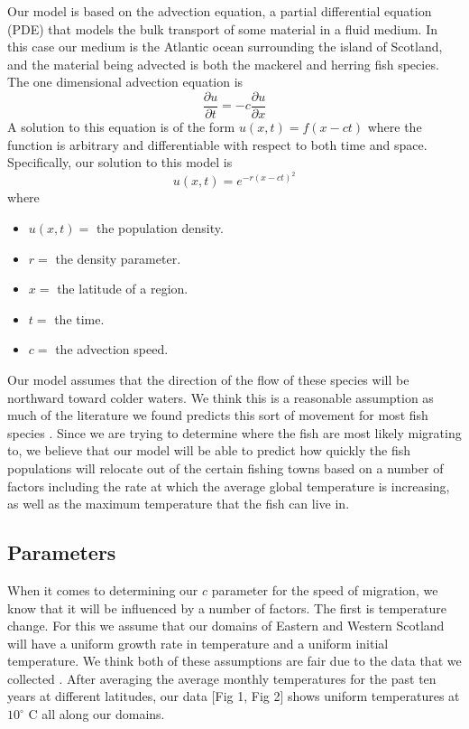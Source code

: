 \documentclass[12pt]{article}
\begin{document}
Our model is based on the advection equation, a partial differential equation (PDE) that models the bulk transport of some material in a fluid medium. In this case our medium is the Atlantic ocean surrounding the island of Scotland, and the material being advected is both the mackerel and herring fish species. The one dimensional advection equation is 
$$\frac{\partial u}{\partial t}= -c \frac{\partial u}{\partial x}$$
A solution to this equation is of the form $u(x,t) = f(x-ct)$ where the function is arbitrary and differentiable with respect to both time and space. 
Specifically, our solution to this model is
\[
u(x,t) = e^{-r(x-ct)^2}
\]
where 
\begin{itemize}
    \item \(u(x,t) = \) the population density.
    \item \(r = \) the density parameter.
    \item \(x = \) the latitude of a region.
    \item \(t = \) the time.
    \item \(c = \) the advection speed.
\end{itemize}

Our model assumes that the direction of the flow of these species will be northward toward colder waters. We think this is a reasonable assumption as much of the literature we found predicts this sort of movement for most fish species \cite{findlay_2020, gigy_smalls}. 
Since we are trying to determine where the fish are most likely migrating to, we believe that our model will be able to predict how quickly the fish populations will relocate out of the certain fishing towns based on a number of factors including the rate at which the average global temperature is increasing, as well as the maximum temperature that the fish can live in.

\subsection{Parameters}
When it comes to determining our $c$ parameter for the speed of migration, we know that it will be influenced by a number of factors. The first is temperature change. For this we assume that our domains of Eastern and Western Scotland will have a uniform growth rate in temperature and a uniform initial temperature. We think both of these assumptions are fair due to the data that we collected \cite{tempData}. After averaging the average monthly temperatures for the past ten years at different latitudes, our data [Fig 1, Fig 2] shows uniform temperatures at $10^{\circ}$ C all along our domains. 
\end{document}
